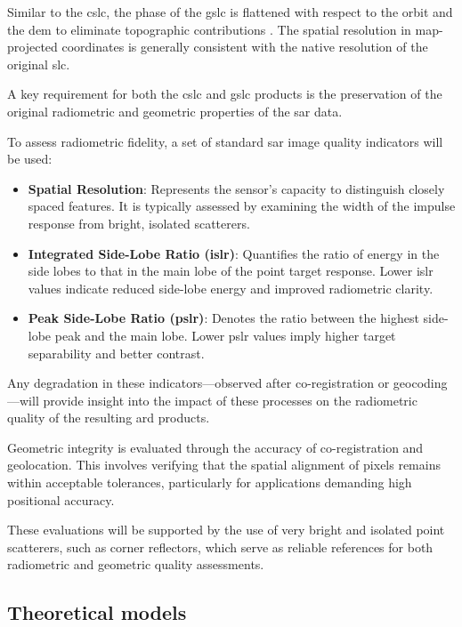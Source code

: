 Similar to the \acs{cslc}, the phase of the \acs{gslc} is flattened with respect to the orbit and the \acs{dem} to eliminate topographic contributions \cite{Zebker2017, Zheng2017}. The spatial resolution in map-projected coordinates is generally consistent with the native resolution of the original \acs{slc}.

A key requirement for both the \acs{cslc} and \acs{gslc} products is the preservation of the original radiometric and geometric properties of the \acs{sar} data.

To assess radiometric fidelity, a set of standard \acs{sar} image quality indicators will be used:

\begin{itemize}
    \item \textbf{Spatial Resolution}: Represents the sensor’s capacity to distinguish closely spaced features. It is typically assessed by examining the width of the impulse response from bright, isolated scatterers.
    \item \textbf{Integrated Side-Lobe Ratio (\acs{islr})}: Quantifies the ratio of energy in the side lobes to that in the main lobe of the point target response. Lower \acs{islr} values indicate reduced side-lobe energy and improved radiometric clarity.
    \item \textbf{Peak Side-Lobe Ratio (\acs{pslr})}: Denotes the ratio between the highest side-lobe peak and the main lobe. Lower \acs{pslr} values imply higher target separability and better contrast.
\end{itemize}

Any degradation in these indicators—observed after co-registration or geocoding—will provide insight into the impact of these processes on the radiometric quality of the resulting \acs{ard} products.

Geometric integrity is evaluated through the accuracy of co-registration and geolocation. This involves verifying that the spatial alignment of pixels remains within acceptable tolerances, particularly for applications demanding high positional accuracy.

These evaluations will be supported by the use of very bright and isolated point scatterers, such as corner reflectors, which serve as reliable references for both radiometric and geometric quality assessments.

\subsection{Theoretical models}
\label{sec:cslc_models}

